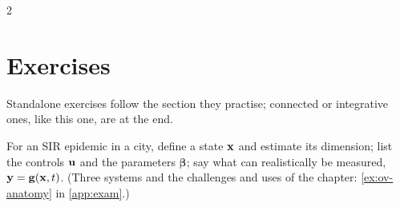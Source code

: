 \begin{paracol}{2}
\section*{Exercises}

Standalone exercises follow the section they practise; connected or integrative ones, like this one, are at the end.

\begin{exercise}\label{ex:ov-anatomy-short}
For an SIR epidemic in a city, define a state $\mathbf{x}$ and estimate its dimension; list the controls $\mathbf{u}$ and the parameters $\boldsymbol\beta$; say what can realistically be measured, $\mathbf{y}=\mathbf{g}(\mathbf{x},t)$. (Three systems and the challenges and uses of the chapter: \cref{ex:ov-anatomy} in \cref{app:exam}.)
\end{exercise}

\end{paracol}
